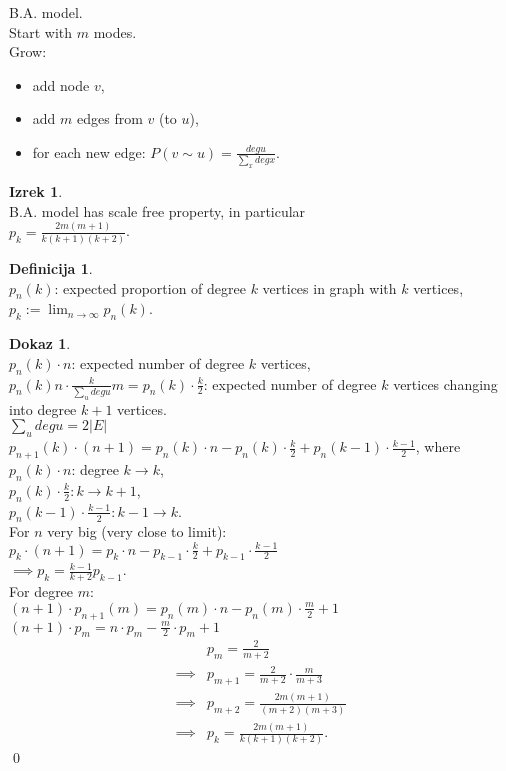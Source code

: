 \documentclass[a4paper, 12pt]{book}
\theoremstyle{definition}
\newtheorem{defn}[counter]{Definicija}
\newtheorem{theorem}[counter]{Izrek}
\newtheorem{pro}[counter]{Dokaz}
\theoremstyle{remark}
\begin{document}
B.A. model. \\
Start with $m$ modes. \\
Grow:
\begin{itemize}
  \item add node $v$,
  \item add $m$ edges from $v$ (to $u$),
  \item for each new edge: $P(v \sim u) = \frac{deg u}{\sum_x deg x}$.
\end{itemize}
\begin{theorem} \text{} \\
  B.A. model has scale free property, in particular \\
  $p_k = \frac{2 m (m+1)}{k (k+1) (k+2)}$.
\end{theorem}
\begin{defn} \text{} \\
  $p_n(k)$: expected proportion of degree $k$ vertices in graph with $k$ vertices, \\
  $p_k := \lim_{n \to \infty} p_n(k)$.
\end{defn}
\begin{pro} \text{} \\
  $p_n(k) \cdot n$: expected number of degree $k$ vertices, \\
  $p_n(k) n \cdot \frac{k}{\sum_u deg u} m = p_n(k) \cdot \frac{k}{2}$:
    expected number of degree $k$ vertices changing into degree $k+1$ vertices. \\
  $\sum_u deg u = 2 |E|$ \\
  $p_{n+1}(k) \cdot (n+1) = p_n(k) \cdot n - p_n(k) \cdot \frac{k}{2} + p_n(k-1) \cdot \frac{k-1}{2}$, where \\
  $p_n(k) \cdot n$: degree $k \to k$, \\
  $p_n(k) \cdot \frac{k}{2}: k \to k+1$, \\
  $p_n(k-1) \cdot \frac{k-1}{2}: k-1 \to k$. \\
  For $n$ very big (very close to limit): \\
  $p_k \cdot (n+1) = p_k \cdot n - p_{k-1} \cdot \frac{k}{2} + p_{k-1} \cdot \frac{k-1}{2}$ \\
  $\implies p_k = \frac{k-1}{k+2} p_{k-1}$. \\
  For degree $m$: \\
  $(n+1) \cdot p_{n+1}(m) = p_n(m) \cdot n - p_n(m) \cdot \frac{m}{2} + 1$ \\%
  $(n+1) \cdot p_m = n \cdot p_m - \frac{m}{2} \cdot p_m + 1$
  \begin{align*}
    &p_m = \frac{2}{m+2} \\
    \implies &p_{m+1} = \frac{2}{m+2} \cdot \frac{m}{m+3} \\
    \implies &p_{m+2} = \frac{2m(m+1)}{(m+2)(m+3)} \\
    \implies &p_k = \frac{2m(m+1)}{k(k+1)(k+2)}.
  \end{align*}
  \qed
\end{pro}
\end{document}
